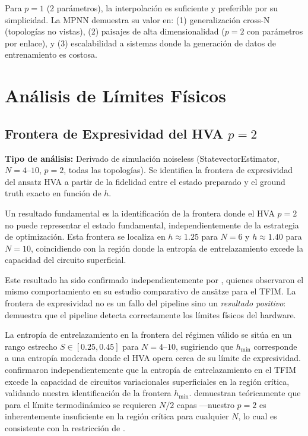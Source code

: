 \documentclass[11pt,a4paper,spanish]{book}
\begin{document}
Para $p = 1$ (2 parámetros), la interpolación es suficiente y preferible por su simplicidad. La MPNN demuestra su valor en: (1) generalización cross-N (topologías no vistas), (2) paisajes de alta dimensionalidad ($p = 2$ con parámetros por enlace), y (3) escalabilidad a sistemas donde la generación de datos de entrenamiento es costosa.

\section{Análisis de Límites Físicos}

\subsection{Frontera de Expresividad del HVA $p = 2$}

\textbf{Tipo de análisis:} Derivado de simulación noiseless (StatevectorEstimator, $N = 4$--$10$, $p = 2$, todas las topologías). Se identifica la frontera de expresividad del ansatz HVA a partir de la fidelidad entre el estado preparado y el ground truth exacto en función de $h$.

Un resultado fundamental es la identificación de la frontera donde el HVA $p = 2$ no puede representar el estado fundamental, independientemente de la estrategia de optimización. Esta frontera se localiza en $h \approx 1.25$ para $N = 6$ y $h \approx 1.40$ para $N = 10$, coincidiendo con la región donde la entropía de entrelazamiento excede la capacidad del circuito superficial.

Este resultado ha sido confirmado independientemente por \citet{tripathi2026}, quienes observaron el mismo comportamiento en su estudio comparativo de ansätze para el TFIM. La frontera de expresividad no es un fallo del pipeline sino un \emph{resultado positivo}: demuestra que el pipeline detecta correctamente los límites físicos del hardware.

La entropía de entrelazamiento en la frontera del régimen válido se sitúa en un rango estrecho $S \in [0.25, 0.45]$ para $N = 4$--$10$, sugiriendo que $h_{\min}$ corresponde a una entropía moderada donde el HVA opera cerca de su límite de expresividad. \citet{kumar2026} confirmaron independientemente que la entropía de entrelazamiento en el TFIM excede la capacidad de circuitos variacionales superficiales en la región crítica, validando nuestra identificación de la frontera $h_{\min}$. \citet{sumeet2025} demuestran teóricamente que para el límite termodinámico se requieren $N/2$ capas ---nuestro $p = 2$ es inherentemente insuficiente en la región crítica para cualquier $N$, lo cual es consistente con la restricción de \citet{mele2026}.
\end{document}
